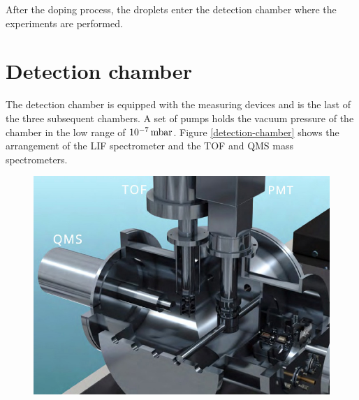 \documentclass[parskip,12pt,headsepline,a4paper] {scrbook}
\begin{document}
After the doping process, the droplets enter the detection chamber where the experiments are performed.


\section{Detection chamber}
\vspace{-1\baselineskip}
The detection chamber is equipped with the measuring devices and is the last of the three subsequent chambers. A set of pumps holds the vacuum pressure of the chamber in the low range of $\unit[10^{-7}]{mbar}$. Figure \ref{detection-chamber} shows the arrangement of the LIF spectrometer and the TOF and QMS mass spectrometers.

\begin{figure}[ht]
\centerline{
\includegraphics[width=15cm]{./experimental_setup/detection-chamber.jpg}}
\end{figure}
\end{document}

